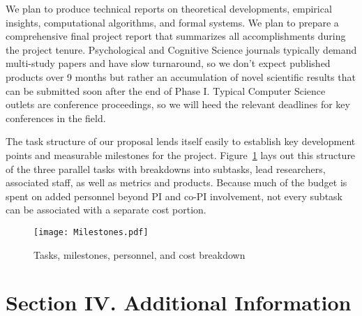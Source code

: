 \documentclass[12pt]{article}
\begin{document}
\vspace{1mm}
 We plan to produce technical reports on theoretical developments, empirical insights, computational algorithms, and formal systems.  We plan to prepare a comprehensive final project report that summarizes all accomplishments during the project tenure. Psychological and Cognitive Science journals typically demand multi-study papers and have slow turnaround, so we don't expect published products over 9 months but rather an accumulation of
novel scientific results that can be submitted soon after the end of Phase I.
Typical Computer Science outlets are conference proceedings, so we
will heed the relevant deadlines for key conferences in the field.

\vspace{1mm}
 The task structure of our proposal lends itself easily to establish
key development points and measurable milestones for the project.
Figure~\ref{fig:Milestones} lays out this structure of the three parallel tasks with
breakdowns into subtasks, lead researchers, associated staff,
as well as metrics and products.  Because much of the budget is spent on
added personnel beyond PI and co-PI involvement, not every subtask can be associated with a separate cost portion.
 

\begin{figure}[h!]
 \texttt{[image: Milestones.pdf]}
  \caption{\small Tasks, milestones, personnel, and cost breakdown}
  \label{fig:Milestones}
  \end{figure}


{\small

}

\newpage

\section*{Section IV. Additional Information}


\vspace{3mm}

% 
\end{document}
